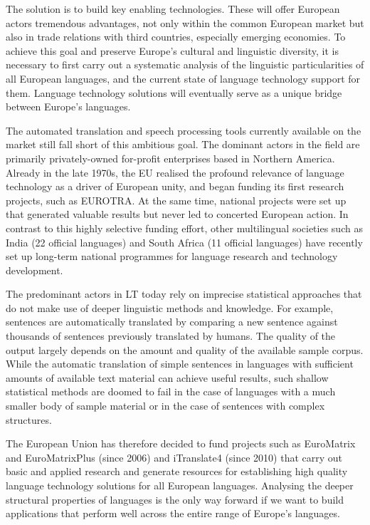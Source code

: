 \documentclass[]{../metanetpaper}
\begin{document}
\begin{Parallel}[c]{80mm}{80mm}
{    The solution is to build key enabling technologies. These will offer European actors tremendous advantages, not only within the common European market but also in trade relations with third countries, especially emerging economies. To achieve this goal and preserve Europe’s cultural and linguistic diversity, it is necessary to first carry out a systematic analysis of the linguistic particularities of all European languages, and the current state of language technology support for them. Language technology solutions will eventually serve as a unique bridge between Europe’s languages.


    The automated translation and speech processing tools currently available on the market still fall short of this ambitious goal. The dominant actors in the field are primarily privately-owned for-profit enterprises based in Northern America. Already in the late 1970s, the EU realised the profound relevance of language technology as a driver of European unity, and began funding its first research projects, such as EUROTRA. At the same time, national projects were set up that generated valuable results but never led to concerted European action. In contrast to this highly selective funding effort, other multilingual societies such as India (22 official languages) and South Africa (11 official languages) have recently set up long-term national programmes for language research and technology development. 

    The predominant actors in LT today rely on imprecise statistical approaches that do not make use of deeper linguistic methods and knowledge. For example, sentences are automatically translated by comparing a new sentence against thousands of sentences previously translated by humans. The quality of the output largely depends on the amount and quality of the available sample corpus. While the automatic translation of simple sentences in languages with sufficient amounts of available text material can achieve useful results, such shallow statistical methods are doomed to fail in the case of languages with a much smaller body of sample material or in the case of sentences with complex structures.

    The European Union has therefore decided to fund projects such as EuroMatrix and EuroMatrixPlus (since 2006) and iTranslate4 (since 2010) that carry out basic and applied research and generate resources for establishing high quality language technology solutions for all European languages. Analysing the deeper structural properties of languages is the only way forward if we want to build applications that perform well across the entire range of Europe’s languages.

}
\end{Parallel}
\end{document}
